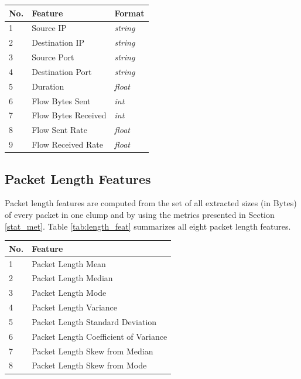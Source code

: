 \begin{center}
\begin{tabular}{ |l|l|l| }
\hline
No. & Feature & Format \\
\hline
1 & Source IP & \textit{string} \\
\hline
2 & Destination IP & \textit{string} \\
\hline
3 & Source Port & \textit{string} \\
\hline
4 & Destination Port & \textit{string} \\
\hline
5 & Duration & \textit{float} \\
\hline
6 & Flow Bytes Sent & \textit{int} \\
\hline
7 & Flow Bytes Received & \textit{int} \\
\hline
8 & Flow Sent Rate & \textit{float} \\
\hline
9 & Flow Received Rate & \textit{float} \\
\hline
\end{tabular}
\label{tab:head_feat}
\end{center}

\subsection{Packet Length Features} \label{pack_length}
Packet length features are computed from the set of all extracted sizes (in Bytes) of every packet in one clump and by using the metrics presented in Section \ref{stat_met}. Table \ref{tab:length_feat} summarizes all eight packet length features. 

\begin{center}
\begin{tabular}{ |l|l| }
\hline
No. & Feature \\
\hline
1 & Packet Length Mean \\
\hline
2 & Packet Length Median \\
\hline
3 & Packet Length Mode \\
\hline
4 & Packet Length Variance \\
\hline
5 & Packet Length Standard Deviation \\
\hline
6 & Packet Length Coefficient of Variance \\
\hline
7 & Packet Length Skew from Median \\
\hline
8 & Packet Length Skew from Mode  \\
\hline
\end{tabular}
\label{tab:length_feat}
\end{center}

